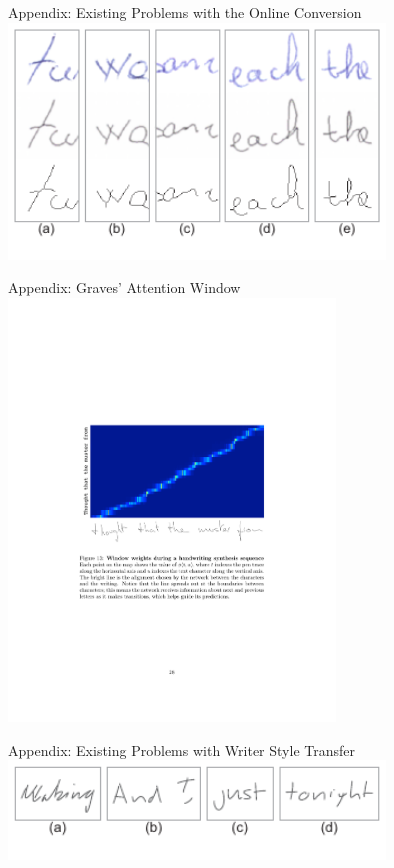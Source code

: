 \documentclass[aspectratio=169]{beamer}
\begin{document}
\begin{frame}{Appendix: Existing Problems with the Online Conversion}
    \centering
    \vspace{1em}
    \includegraphics[width=0.75\textwidth]{../thesis/assets/skeletonization/compare_fail/fail_table.pdf}
\end{frame}


\begin{frame}{Appendix: Graves' Attention Window}
    \centering
    \includegraphics[width=0.65\textwidth]{../thesis/assets/style_transfer/graves_temporal_matching.pdf}
\end{frame}

\begin{frame}{Appendix: Existing Problems with Writer Style Transfer}
    \centering
    \vspace{1em}
    \includegraphics[width=0.75\textwidth]{../thesis/assets/style_transfer/failures.pdf}
\end{frame}
\end{document}
